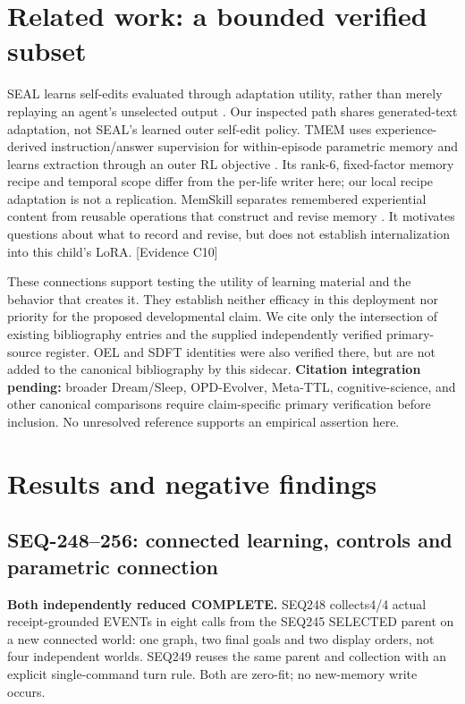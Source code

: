 \documentclass[11pt]{article}
\newcommand{\ev}[1]{\textsf{[Evidence #1]}}
\begin{document}
\section{Related work: a bounded verified subset}
SEAL learns self-edits evaluated through adaptation utility, rather than merely
replaying an agent's unselected output \cite{zweiger2025seal}. Our inspected path
shares generated-text adaptation, not SEAL's learned outer self-edit policy.
TMEM uses experience-derived instruction/answer supervision for within-episode
parametric memory and learns extraction through an outer RL objective
\cite{ren2026tmem}. Its rank-6, fixed-factor memory recipe and temporal scope differ
from the per-life writer here; our local recipe adaptation is not a replication.
MemSkill separates remembered experiential content from reusable operations that
construct and revise memory \cite{zhang2026memskill}. It motivates questions
about what to record and revise, but does not establish internalization into this
child's LoRA. \ev{C10}

These connections support testing the utility of learning material and the
behavior that creates it. They establish neither efficacy in this deployment
nor priority for the proposed developmental claim. We cite only the intersection
of existing bibliography entries and the supplied independently verified
primary-source register. OEL and SDFT identities were also verified there, but
are not added to the canonical bibliography by this sidecar. \textbf{Citation
integration pending:} broader Dream/Sleep, OPD-Evolver, Meta-TTL, cognitive-science,
and other canonical comparisons require claim-specific primary verification
before inclusion. No unresolved reference supports an empirical assertion here.

\section{Results and negative findings}
\subsection{SEQ-248--256: connected learning, controls and parametric connection}
\label{sec:event-two-hop-readout}

\textbf{Both independently reduced COMPLETE.} SEQ248 collects4/4 actual
receipt-grounded EVENTs in eight calls from the SEQ245 SELECTED parent on a
new connected world: one graph, two final goals and two display orders, not
four independent worlds. SEQ249 reuses the same parent and collection with an
explicit single-command turn rule. Both are zero-fit; no new-memory write occurs.
\end{document}
